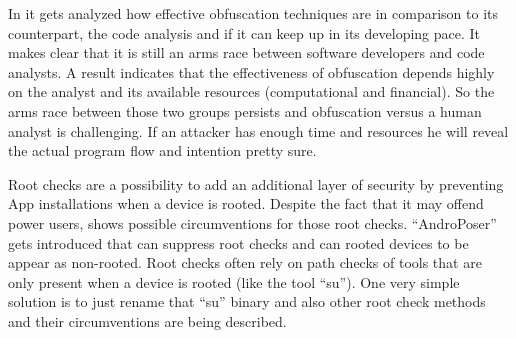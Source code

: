 In \parencite{obfucsation_vs_code_analysis} it gets analyzed how effective obfuscation
techniques are in comparison to its counterpart, the code analysis and if it can 
keep up in its developing pace. It makes clear that it is still an arms race between 
software developers and code analysts. A result indicates that the effectiveness of 
obfuscation depends highly on the analyst and its available resources (computational and
financial). So the arms race between those two groups persists and obfuscation versus 
a human analyst is challenging. If an attacker has enough time and resources he will
reveal the actual program flow and intention pretty sure. 

Root checks are a possibility to add an additional layer of security by preventing App installations when a device is rooted. Despite the fact that it may offend power users,
\parencite{root_checks} shows possible circumventions for those root checks. ``AndroPoser'' gets introduced that can suppress root checks and can rooted devices to be appear as
non-rooted. Root checks often rely on path checks of tools that are only present when a device is rooted (like the tool ``su''). One very simple solution is to just rename that ``su'' binary and also other root check methods and their circumventions are being described. 










